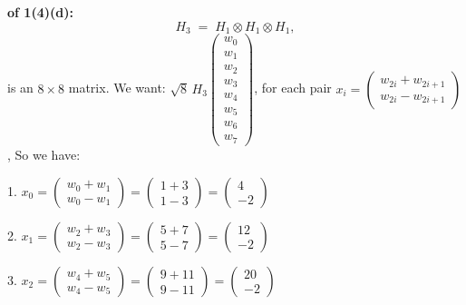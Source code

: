 \documentclass[lang=cn,11pt]{elegantbook}
\begin{document}
\begin{solution}

    \textbf{of 1(4)(d):}\\

\[
H_3 \;=\; H_1 \otimes H_1 \otimes H_1,
\]
is an \(8\times 8\) matrix.  
We want:
\(
\sqrt{8}\,H_3
\begin{pmatrix}
w_0 \\
w_1 \\
w_2 \\
w_3 \\
w_4 \\
w_5 \\
w_6 \\
w_7
\end{pmatrix}
\),  for each pair \(
x_i = 
\begin{pmatrix}
w_{2i} + w_{2i+1}\\
w_{2i} - w_{2i+1}
\end{pmatrix}
\), So we have:

1. \(x_0 = \begin{pmatrix} w_0 + w_1 \\ w_0 - w_1 \end{pmatrix}
= \begin{pmatrix}1 + 3 \\ 1 - 3\end{pmatrix}
= \begin{pmatrix}4 \\ -2\end{pmatrix}\)

2. \(x_1 = \begin{pmatrix} w_2 + w_3 \\ w_2 - w_3 \end{pmatrix}
= \begin{pmatrix}5 + 7 \\ 5 - 7\end{pmatrix}
= \begin{pmatrix}12 \\ -2\end{pmatrix}\)

3. \(x_2 = \begin{pmatrix} w_4 + w_5 \\ w_4 - w_5 \end{pmatrix}
= \begin{pmatrix}9 + 11 \\ 9 - 11\end{pmatrix}
= \begin{pmatrix}20 \\ -2\end{pmatrix}\)


\end{solution}
\end{document}
